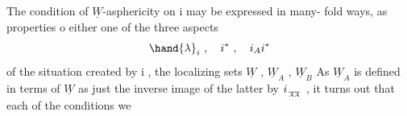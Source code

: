 The condition  of $\underline{W}$-asphericity on i may be expressed in many-%
fold ways, as properties o either one of the three aspects
\[ \hand{\lambda}_i \ , \quad i^* \ , \quad i_Ai^* \]
of the situation created by i ,   the localizing sets $\underline{W}$ , $\underline{W}_A$ , $\underline{W}_B$ \hand{,}  \margin{$\checkmark$}
As $\underline{W}_A$ is defined in terms of $\underline{W}$ as just the inverse image of the latter
by $i_{\over{A}{A}}$ ,  \hand{(}it turns out that each of the conditions we 
